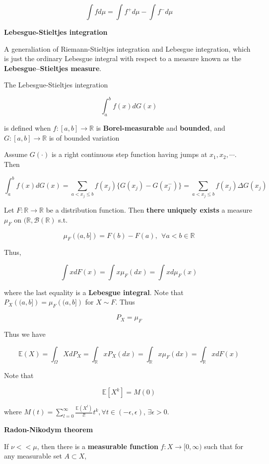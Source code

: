 \documentclass[12pt]{article}
\theoremstyle{nonumberbreak}
\begin{document}
$$
\int f d\mu = \int f^+ d\mu - \int f^- d\mu
$$


\pagebreak
\textbf{Lebesgue-Stieltjes integration}

A generaliation of Riemann-Stieltjes integration and Lebesgue integration, which is just the ordinary Lebesgue integral with respect to a measure known as the \textbf{Lebesgue–Stieltjes measure}. 

The Lebesgue-Stieltjes integration

$$
\int_a^b f(x) d G(x)
$$

is defined when $f: [a,b] \to \mathbb{R}$ is \textbf{Borel-measurable} and \textbf{bounded}, and $G : [a,b] \to \mathbb{R}$ is of bounded variation



Assume $G(\cdot)$ is a right continuous step function having jumps at $x_1,x_2,\cdots$. Then

$$
\int_a^b f(x) dG(x) = \sum_{a < x_j \le b} f(x_j) \{ G(x_j) - G(x_j^-) \} = \sum_{a < x_j \le b} f(x_j) \Delta G(x_j)
$$


Let $F : \mathbb{R} \to \mathbb{R}$ be a distribution function. Then \textbf{there uniquely exists} a measure $\mu_F$ on $(\mathbb{R}, \mathcal{B} (\mathbb{R})$ s.t. 

$$
\mu_F \left((a,b] \right) = F(b) - F(a), \ \ \forall a < b \in \mathbb{R}
$$

Thus, 

$$
\int x dF(x) = \int x \mu_F (dx) = \int x d \mu_F(x)
$$

where the last equality is a \textbf{Lebesgue integral}. Note that $P_X\left( (a,b] \right) = \mu_F \left( (a,b] \right)$ for $X \sim F$. Thus

$$
P_X = \mu_F
$$

Thus we have

$$
\mathbb{E}(X) = \int_\Omega X dP_X = \int_\mathbb{R} x P_X (dx) = \int_\mathbb{R} x \mu_F (dx) = \int_\mathbb{R} x dF(x)
$$


Note that 

$$
\mathbb{E}[X^k] = M(0)
$$

where $M(t) = \sum_{l=0}^\infty \frac{\mathbb{E} (X^l)}{l!} t^k, \forall t \in (-\epsilon, \epsilon)$, $\exists \epsilon >0$.



\textbf{Radon-Nikodym theorem}

If $\nu << \mu$, then there is a \textbf{measurable function} $f: X \to [0, \infty)$ such that for any measurable set $A \subset X$, 
\end{document}
